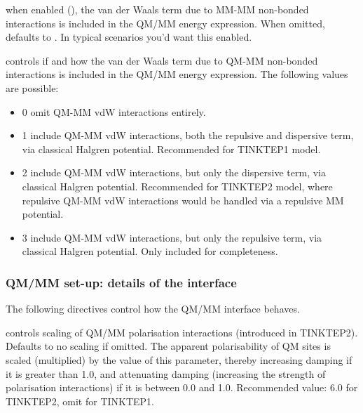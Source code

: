 \documentclass[letterpaper,10pt,english]{sphinxmanual}
\begin{document}
  \textendash{} when
enabled (), the van der Waals term due to MM-MM non-bonded
interactions is included in the QM/MM energy expression. When omitted,
defaults to . In typical scenarios you’d want this enabled.

  \textendash{} controls if and how the van der Waals term due to
QM-MM non-bonded interactions is included in the QM/MM energy
expression. The following values are possible:
\begin{itemize}
\item {} 
0 \textendash{} omit QM-MM vdW interactions entirely.

\item {} 
1 \textendash{} include QM-MM vdW interactions, both the repulsive and dispersive
term, via classical Halgren potential. Recommended for TINKTEP1
model.

\item {} 
2 \textendash{} include QM-MM vdW interactions, but only the dispersive term, via
classical Halgren potential. Recommended for TINKTEP2 model, where
repulsive QM-MM vdW interactions would be handled via a repulsive MM
potential.

\item {} 
3 \textendash{} include QM-MM vdW interactions, but only the repulsive term, via
classical Halgren potential. Only included for completeness.

\end{itemize}


\subsubsection{QM/MM set-up: details of the interface}
\label{\detokenize{tinktep:qm-mm-set-up-details-of-the-interface}}
The following directives control how the QM/MM interface behaves.

  \textendash{} controls scaling
of QM/MM polarisation interactions (introduced in TINKTEP2). Defaults to
no scaling if omitted. The apparent polarisability of QM sites is scaled
(multiplied) by the value of this parameter, thereby increasing damping
if it is greater than 1.0, and attenuating damping (increasing the
strength of polarisation interactions) if it is between 0.0 and 1.0.
Recommended value: 6.0 for TINKTEP2, omit for TINKTEP1.
\end{document}

